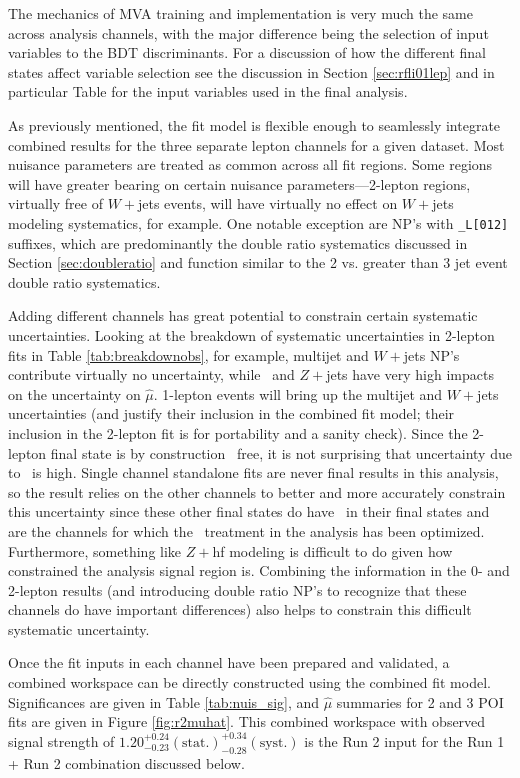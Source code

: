 The mechanics of MVA training and implementation is very much the same across analysis channels, with the major difference being the selection of input variables to the BDT discriminants.  For a discussion of how the different final states affect variable selection see the discussion in Section \ref{sec:rfli01lep} and in particular Table \label{tbl:MVAinputs} for the input variables used in the final analysis.

As previously mentioned, the fit model is flexible enough to seamlessly integrate combined results for the three separate lepton channels for a given dataset.  Most nuisance parameters are treated as common across all fit regions.  Some regions will have greater bearing on certain nuisance parameters---2-lepton regions, virtually free of $W+$jets events, will have virtually no effect on $W+$jets modeling systematics, for example.  One notable exception are NP's with \texttt{\_L[012]} suffixes, which are predominantly the double ratio systematics discussed in Section \ref{sec:doubleratio} and function similar to the 2 vs. greater than 3 jet event double ratio systematics.  

Adding different channels has great potential to constrain certain systematic uncertainties.  Looking at the breakdown of systematic uncertainties in 2-lepton fits in Table \ref{tab:breakdownobs}, for example, multijet and $W+$jets NP's contribute virtually no uncertainty, while \met\ and $Z+$jets have very high impacts on the uncertainty on $\hat{\mu}$.  1-lepton events will bring up the multijet and $W+$jets uncertainties (and justify their inclusion in the combined fit model; their inclusion in the 2-lepton fit is for portability and a sanity check).  Since the 2-lepton final state is by construction \met\ free, it is not surprising that uncertainty due to \met\ is high.  Single channel standalone fits are never final results in this analysis, so the result relies on the other channels to better and more accurately constrain this uncertainty since these other final states do have \met\ in their final states and are the channels for which the \met\ treatment in the analysis has been optimized.  Furthermore, something like $Z+$hf modeling is difficult to do given how constrained the analysis signal region is.  Combining the information in the 0- and 2-lepton results (and introducing double ratio NP's to recognize that these channels do have important differences) also helps to constrain this difficult systematic uncertainty.

Once the fit inputs in each channel have been prepared and validated, a combined workspace can be directly constructed using the combined fit model.  Significances are given in Table \ref{tab:nuis_sig}, and $\hat{\mu}$ summaries for 2 and 3 POI fits are given in Figure \ref{fig:r2muhat}.  This combined workspace with observed signal strength of $1.20^{+0.24}_{-0.23}(\textrm{stat.})^{+0.34}_{-0.28}(\textrm{syst.})$ is the Run 2 input for the Run 1 + Run 2 combination discussed below.

